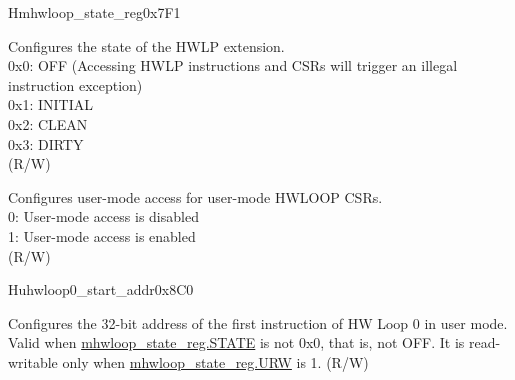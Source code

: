 \begin{register}{H}{mhwloop\_state\_reg}{0x7F1}\label{regdesc:mhwlp_state_reg}
%
%
%
\regnewline%
\begin{regdesc}\begin{reglist}
\label{fielddesc:HWSTATE}\item [STATE] Configures the state of the HWLP extension.\\
0x0: OFF (Accessing HWLP instructions and CSRs will trigger an illegal instruction exception)\\
0x1: INITIAL\\
0x2: CLEAN\\
0x3: DIRTY\\
(R/W)
\label{fielddesc:URW}\item [URW] Configures user-mode access for user-mode HWLOOP CSRs. \\
0: User-mode access is disabled\\
1: User-mode access is enabled \\
(R/W)
\end{reglist}\end{regdesc}
\end{register}

\begin{register}{H}{uhwloop0\_start\_addr}{0x8C0}\label{regdesc:uhloop0_start_addr}
%
\regnewline%
\begin{regdesc}\begin{reglist}
\label{fielddesc:UHWLP0_SA}\item [SA] Configures the 32-bit address of the first instruction of HW Loop 0 in user mode. Valid when \hyperref[fielddesc:HWSTATE]{mhwloop\_state\_reg.STATE} is not 0x0, that is, not OFF. It is read-writable only when \hyperref[fielddesc:HWSTATE]{mhwloop\_state\_reg.URW} is 1. (R/W)
\end{reglist}\end{regdesc}
\end{register}

